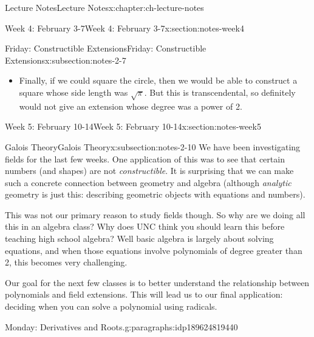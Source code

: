 \documentclass[oneside,11pt,]{book}
\begin{document}
\begin{chapterptx}{Lecture Notes}{}{Lecture Notes}{}{}{x:chapter:ch-lecture-notes}
\begin{sectionptx}{Week 4: February 3-7}{}{Week 4: February 3-7}{}{}{x:section:notes-week4}
\begin{subsectionptx}{Friday: Constructible Extensions}{}{Friday: Constructible Extensions}{}{}{x:subsection:notes-2-7}
\begin{itemize}[label=\textbullet]
\begin{equation*}
\cos(3\theta) = 4\cos^3(\theta) - 3 \cos(\theta)
\end{equation*}
and since \(\cos(60^\circ) = 1/2\), this says that \(\cos(20^\circ)\) is a root of the polynomial \(8x^3 - 6x - 1\) or that \(2\cos(20^\circ)\) is the root of \(x^3 - 3x - 1\). We can show this is irreducible using the rational roots theorem. So again, any extension containing a trisected \(60^\circ\) would have a degree that was a multiple of 3.%
\item{}Finally, if we could square the circle, then we would be able to construct a square whose side length was \(\sqrt{\pi}\). But this is transcendental, so definitely would not give an extension whose degree was a power of 2.%
\end{itemize}
%
\end{subsectionptx}
\end{sectionptx}
%
%
\typeout{************************************************}
\typeout{************************************************}
%
\begin{sectionptx}{Week 5: February 10-14}{}{Week 5: February 10-14}{}{}{x:section:notes-week5}
%
%
\typeout{************************************************}
\typeout{************************************************}
%
\begin{subsectionptx}{Galois Theory}{}{Galois Theory}{}{}{x:subsection:notes-2-10}
We have been investigating fields for the last few weeks. One application of this was to see that certain numbers (and shapes) are not \emph{constructible}. It is surprising that we can make such a concrete connection between geometry and algebra (although \emph{analytic} geometry is just this: describing geometric objects with equations and numbers).%
\par
This was not our primary reason to study fields though. So why are we doing all this in an algebra class? Why does UNC think you should learn this before teaching high school algebra? Well basic algebra is largely about solving equations, and when those equations involve polynomials of degree greater than 2, this becomes very challenging.%
\par
Our goal for the next few classes is to better understand the relationship between polynomials and field extensions. This will lead us to our final application: deciding when you can solve a polynomial using radicals.%
\begin{paragraphs}{Monday: Derivatives and Roots.}{g:paragraphs:idp189624819440}%

\end{paragraphs}
\end{subsectionptx}
\end{sectionptx}
\end{chapterptx}
\end{document}

